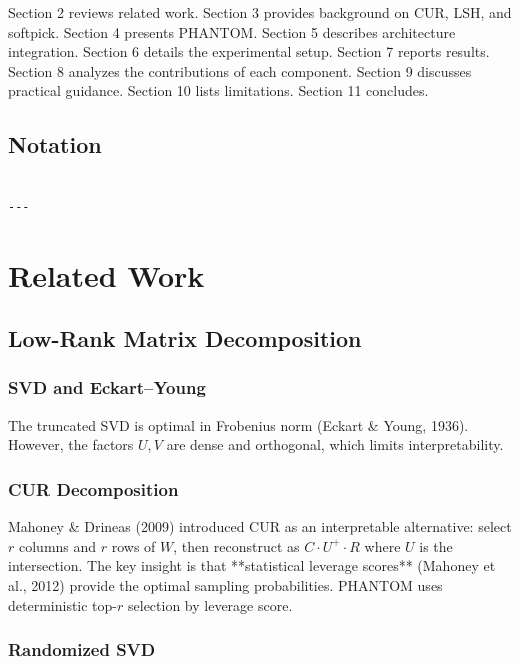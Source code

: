 Section 2 reviews related work. Section 3 provides background on CUR, LSH, 
and softpick. Section 4 presents PHANTOM. Section 5 describes architecture 
integration. Section 6 details the experimental setup. Section 7 reports 
results. Section 8 analyzes the contributions of each component. Section 9 
discusses practical guidance. Section 10 lists limitations. Section 11 
concludes.



\subsection{Notation}

\begin{lstlisting}

---
\end{lstlisting}


\section{Related Work}

\subsection{Low-Rank Matrix Decomposition}

\subsubsection{SVD and Eckart--Young}

The truncated SVD is optimal in Frobenius norm (Eckart \& Young, 1936). However, 
the factors $U, V$ are dense and orthogonal, which limits interpretability.

\subsubsection{CUR Decomposition}

Mahoney \& Drineas (2009) introduced CUR as an interpretable alternative: 
select $r$ columns and $r$ rows of $W$, then reconstruct as $C \cdot U^+ \cdot R$ 
where $U$ is the intersection. The key insight is that **statistical leverage 
scores** (Mahoney et al., 2012) provide the optimal sampling probabilities. 
PHANTOM uses deterministic top-$r$ selection by leverage score.

\subsubsection{Randomized SVD}

